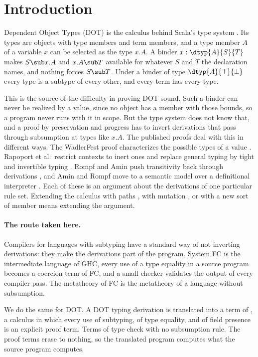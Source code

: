 \section{Introduction}

Dependent Object Types (DOT) is the calculus behind Scala's type system \cite{amin2016essence}. Its types are objects with type members and term members, and a type member $A$ of a variable $x$ can be selected as the type $x.A$. A binder $x : \dtyp{A}{S}{T}$ makes $S \sub x.A$ and $x.A \sub T$ available for whatever $S$ and $T$ the declaration names, and nothing forces $S \sub T$. Under a binder of type $\dtyp{A}{\top}{\bot}$ every type is a subtype of every other, and every term has every type.

This is the source of the difficulty in proving DOT sound. Such a binder can never be realized by a value, since no object has a member with those bounds, so a program never runs with it in scope. But the type system does not know that, and a proof by preservation and progress has to invert derivations that pass through subsumption at types like $x.A$. The published proofs deal with this in different ways. The WadlerFest proof characterizes the possible types of a value \cite{amin2016essence}. Rapoport et al.\ restrict contexts to inert ones and replace general typing by tight and invertible typing \cite{rapoport2017simple}. Rompf and Amin push transitivity back through derivations \cite{rompf2016soundness}, and Amin and Rompf move to a semantic model over a definitional interpreter \cite{amin2017definitional}. Each of these is an argument about the derivations of one particular rule set. Extending the calculus with paths \cite{rapoport2019path}, with mutation \cite{kabir2018kdot}, or with a new sort of member means extending the argument.

\paragraph{The route taken here.}
Compilers for languages with subtyping have a standard way of not inverting derivations: they make the derivations part of the program. System FC \cite{sulzmann2007fc} is the intermediate language of GHC, every use of a type equality in a source program becomes a coercion term of FC, and a small checker validates the output of every compiler pass. The metatheory of FC is the metatheory of a language without subsumption.

We do the same for DOT. A DOT typing derivation is translated into a term of \FCdot, a calculus in which every use of subtyping, of type equality, and of field presence is an explicit proof term. Terms of \FCdot type check with no subsumption rule. The proof terms erase to nothing, so the translated program computes what the source program computes.

